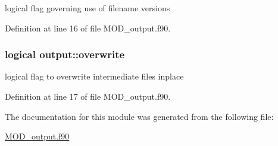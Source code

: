 logical flag governing use of filename versions 



Definition at line 16 of file M\-O\-D\-\_\-output.\-f90.

\hypertarget{classoutput_a2a293ea1d31588e0629411b07d460c14}{
\subsubsection[{overwrite}]{\setlength{\rightskip}{0pt plus 5cm}logical output\-::overwrite}}\label{classoutput_a2a293ea1d31588e0629411b07d460c14}


logical flag to overwrite intermediate files inplace 



Definition at line 17 of file M\-O\-D\-\_\-output.\-f90.



The documentation for this module was generated from the following file\-:\begin{DoxyCompactItemize}
\item 
\hyperlink{MOD__output_8f90}{M\-O\-D\-\_\-output.\-f90}\end{DoxyCompactItemize}

